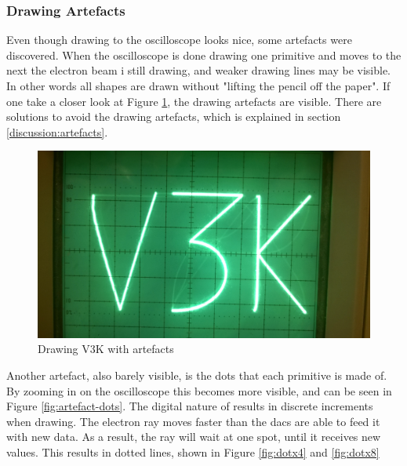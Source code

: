 \subsubsection{Drawing Artefacts}
\label{results:artefacts}
Even though drawing to the oscilloscope looks nice, some artefacts were discovered.
When the oscilloscope is done drawing one primitive and moves to the next the electron beam i still drawing,
and weaker drawing lines may be visible.
In other words all shapes are drawn without "lifting the pencil off the paper".
If one take a closer look at Figure \ref{fig:artefact}, the drawing artefacts are visible.
There are solutions to avoid the drawing artefacts, which is explained in section \ref{discussion:artefacts}.

\begin{figure}[h!]
	    \includegraphics[width=\linewidth]{images/artefacts.jpg}
	    \caption{Drawing V3K with artefacts}
	    \label{fig:artefact}
\end{figure}

Another artefact, also barely visible, is the dots that each primitive is made of.
By zooming in on the oscilloscope this becomes more visible, and can be seen in Figure \ref{fig:artefact-dots}.
The digital nature of \vthreek results in discrete increments when drawing.
The electron ray moves faster than the \gls{dac}s are able to feed it with new data.
As a result, the ray will wait at one spot, until it receives new values.
This results in dotted lines, shown in Figure \ref{fig:dotx4} and \ref{fig:dotx8}

